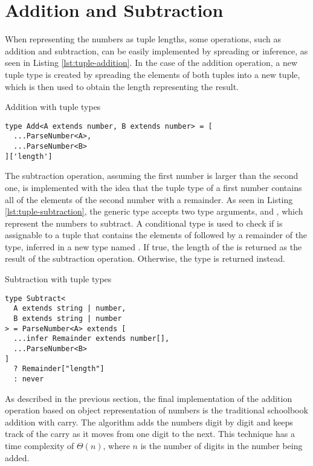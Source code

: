 \section{Addition and Subtraction}

When representing the numbers as tuple lengths, some operations, such as addition and subtraction, can be easily implemented by spreading or inference, as seen in Listing \ref{lst:tuple-addition}. In the case of the addition operation, a new tuple type is created by spreading the elements of both tuples into a new tuple, which is then used to obtain the length representing the result.

\begin{listing}[ht]
  \caption{Addition with tuple types}\label{lst:tuple-addition}
  \begin{verbatim}
type Add<A extends number, B extends number> = [
  ...ParseNumber<A>, 
  ...ParseNumber<B>
]['length']
\end{verbatim}
\end{listing}

The subtraction operation, assuming the first number is larger than the second one, is implemented with the idea that the tuple type of a first number contains all of the elements of the second number with a remainder. As seen in Listing \ref{lst:tuple-subtraction}, the  generic type accepts two type arguments,  and , which represent the numbers to subtract. A conditional type is used to check if  is assignable to a tuple that contains the elements of  followed by a remainder of the  type, inferred in a new type named . If true, the length of the  is returned as the result of the subtraction operation. Otherwise, the  type is returned instead.

\begin{listing}[ht]
  \caption{Subtraction with tuple types}\label{lst:tuple-subtraction}
  \begin{verbatim}
type Subtract<
  A extends string | number,
  B extends string | number
> = ParseNumber<A> extends [
  ...infer Remainder extends number[],
  ...ParseNumber<B>
]
  ? Remainder["length"]
  : never
\end{verbatim}
\end{listing}

As described in the previous section, the final implementation of the addition operation based on object representation of numbers is the traditional schoolbook addition with carry. The algorithm adds the numbers digit by digit and keeps track of the carry as it moves from one digit to the next. This technique has a time complexity of $\Theta(n)$, where $n$ is the number of digits in the number being added.

